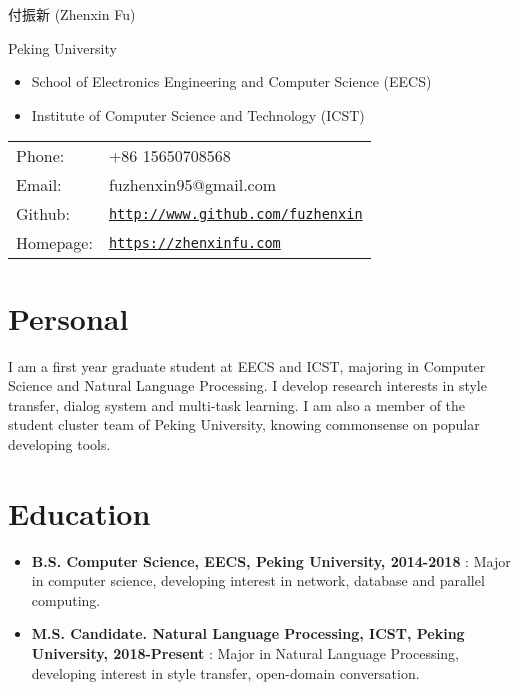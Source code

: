 \documentclass[letterpaper]{article}
\begin{document}


{\huge 付振新 (Zhenxin Fu)}


\vspace{0.25in}

\begin{minipage}{0.45\linewidth}
  \begin{large}Peking University\end{large}
  \begin{itemize}
    \itemsep=-0.02in
      \item School of Electronics Engineering and Computer Science (EECS)
      \item Institute of Computer Science and Technology (ICST)
  \end{itemize}
  
\end{minipage}
\begin{minipage}{0.45\linewidth}
  \begin{tabular}{ll}
    Phone: & +86 15650708568 \\
    Email: & fuzhenxin95@gmail.com \\
    Github: & \href{http://www.github.com/fuzhenxin}{\tt http://www.github.com/fuzhenxin} \\
    Homepage: & \href{https://zhenxinfu.com}{\tt https://zhenxinfu.com} \\
  \end{tabular}
\end{minipage}


\section*{Personal}
I am a first year graduate student at EECS and ICST, majoring in Computer Science and Natural Language Processing. I develop research interests in style transfer, dialog system and multi-task learning. I am also a member of the student cluster team of Peking University, knowing commonsense on popular developing tools. 


\section*{Education}
\begin{itemize}
  \item \textbf{B.S. Computer Science, EECS, Peking University, 2014-2018} : Major in computer science, developing interest in network, database and parallel computing.
  \item \textbf{M.S. Candidate. Natural Language Processing, ICST, Peking University, 2018-Present} : Major in Natural Language Processing, developing interest in style transfer, open-domain conversation.
\end{itemize}
\end{document}
